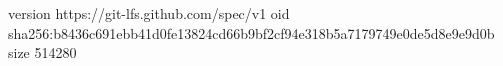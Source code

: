 version https://git-lfs.github.com/spec/v1
oid sha256:b8436c691ebb41d0fe13824cd66b9bf2cf94e318b5a7179749e0de5d8e9e9d0b
size 514280

